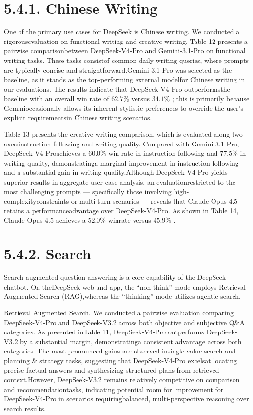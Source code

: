 \documentclass[
  10
]{article}
\begin{document}
\section{5.4.1. Chinese Writing}\label{chinese-writing}

One of the primary use cases for DeepSeek is Chinese writing. We
conducted a rigorousevaluation on functional writing and creative
writing. Table 12 presents a pairwise comparisonbetween DeepSeek-V4-Pro
and Gemini-3.1-Pro on functional writing tasks. These tasks consistof
common daily writing queries, where prompts are typically concise and
straightforward.Gemini-3.1-Pro was selected as the baseline, as it
stands as the top-performing external modelfor Chinese writing in our
evaluations. The results indicate that DeepSeek-V4-Pro outperformsthe
baseline with an overall win rate of \(6 2 . 7 \%\) versus
\(3 4 . 1 \%\) ; this is primarily because Geminioccasionally allows its
inherent stylistic preferences to override the user's explicit
requirementsin Chinese writing scenarios.

Table 13 presents the creative writing comparison, which is evaluated
along two axes:instruction following and writing quality. Compared with
Gemini-3.1-Pro, DeepSeek-V4-Proachieves a \(6 0 . 0 \%\) win rate in
instruction following and \(7 7 . 5 \%\) in writing quality,
demonstratinga marginal improvement in instruction following and a
substantial gain in writing quality.Although DeepSeek-V4-Pro yields
superior results in aggregate user case analysis, an
evaluationrestricted to the most challenging prompts --- specifically
those involving high-complexityconstraints or multi-turn scenarios ---
reveals that Claude Opus 4.5 retains a performanceadvantage over
DeepSeek-V4-Pro. As shown in Table 14, Claude Opus 4.5 achieves a
\(5 2 . 0 \%\) winrate versus \(4 5 . 9 \%\) .

\section{5.4.2. Search}\label{search}

Search-augmented question answering is a core capability of the DeepSeek
chatbot. On theDeepSeek web and app, the ``non-think'' mode employs
Retrieval-Augmented Search (RAG),whereas the ``thinking'' mode utilizes
agentic search.

Retrieval Augmented Search. We conducted a pairwise evaluation comparing
DeepSeek-V4-Pro and DeepSeek-V3.2 across both objective and subjective
Q\&A categories. As presented inTable 11, DeepSeek-V4-Pro outperforms
DeepSeek-V3.2 by a substantial margin, demonstratinga consistent
advantage across both categories. The most pronounced gains are observed
insingle-value search and planning \& strategy tasks, suggesting that
DeepSeek-V4-Pro excelsat locating precise factual answers and
synthesizing structured plans from retrieved context.However,
DeepSeek-V3.2 remains relatively competitive on comparison and
recommendationtasks, indicating potential room for improvement for
DeepSeek-V4-Pro in scenarios requiringbalanced, multi-perspective
reasoning over search results.
\end{document}
